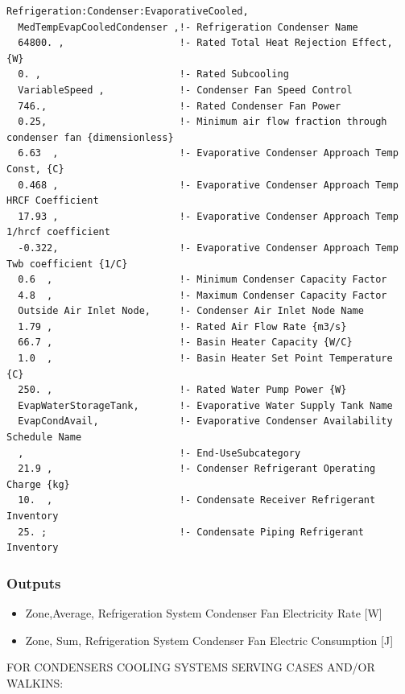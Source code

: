 \begin{lstlisting}
Refrigeration:Condenser:EvaporativeCooled,
  MedTempEvapCooledCondenser ,!- Refrigeration Condenser Name
  64800. ,                    !- Rated Total Heat Rejection Effect, {W}
  0. ,                        !- Rated Subcooling
  VariableSpeed ,             !- Condenser Fan Speed Control
  746.,                       !- Rated Condenser Fan Power
  0.25,                       !- Minimum air flow fraction through condenser fan {dimensionless}
  6.63  ,                     !- Evaporative Condenser Approach Temp Const, {C}
  0.468 ,                     !- Evaporative Condenser Approach Temp HRCF Coefficient
  17.93 ,                     !- Evaporative Condenser Approach Temp 1/hrcf coefficient
  -0.322,                     !- Evaporative Condenser Approach Temp Twb coefficient {1/C}
  0.6  ,                      !- Minimum Condenser Capacity Factor
  4.8  ,                      !- Maximum Condenser Capacity Factor
  Outside Air Inlet Node,     !- Condenser Air Inlet Node Name
  1.79 ,                      !- Rated Air Flow Rate {m3/s}
  66.7 ,                      !- Basin Heater Capacity {W/C}
  1.0  ,                      !- Basin Heater Set Point Temperature {C}
  250. ,                      !- Rated Water Pump Power {W}
  EvapWaterStorageTank,       !- Evaporative Water Supply Tank Name
  EvapCondAvail,              !- Evaporative Condenser Availability Schedule Name
  ,                           !- End-UseSubcategory
  21.9 ,                      !- Condenser Refrigerant Operating Charge {kg}
  10.  ,                      !- Condensate Receiver Refrigerant Inventory
  25. ;                       !- Condensate Piping Refrigerant Inventory
\end{lstlisting}

\subsubsection{Outputs}\label{outputs-7-008}

\begin{itemize}
\item
  Zone,Average, Refrigeration System Condenser Fan Electricity Rate {[}W{]}
\item
  Zone, Sum, Refrigeration System Condenser Fan Electric Consumption {[}J{]}
\end{itemize}

FOR CONDENSERS COOLING SYSTEMS SERVING CASES AND/OR WALKINS:

